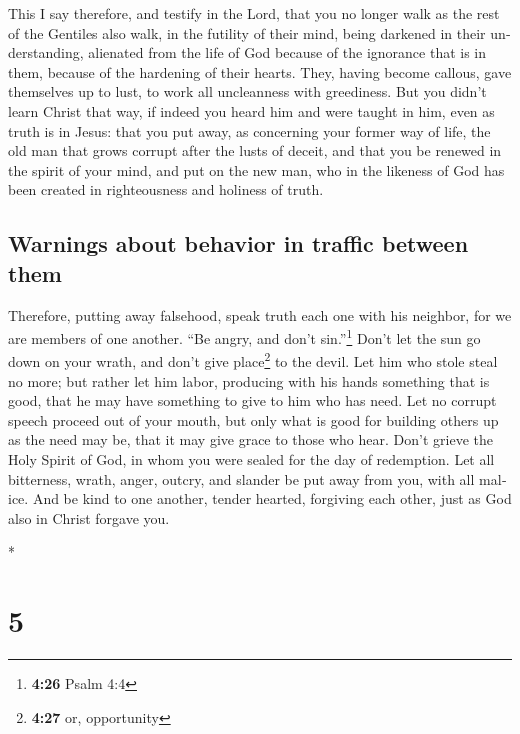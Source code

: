 \begin{paracol}{2}
\begin{otherlanguage}{english}
 This I say therefore, and testify in the Lord, that you
no longer walk as the rest of the Gentiles also walk, in the futility of
their mind,  being darkened in their understanding,
alienated from the life of God because of the ignorance that is in them,
because of the hardening of their hearts.  They, having
become callous, gave themselves up to lust, to work all uncleanness with
greediness.  But you didn't learn Christ that way,
 if indeed you heard him and were taught in him, even as
truth is in Jesus:  that you put away, as concerning your
former way of life, the old man that grows corrupt after the lusts of
deceit,  and that you be renewed in the spirit of your
mind,  and put on the new man, who in the likeness of God
has been created in righteousness and holiness of truth.

\hypertarget{warnings-about-behavior-in-traffic-between-them}{%
\subsection{Warnings about behavior in traffic between
them}\label{warnings-about-behavior-in-traffic-between-them}}

 Therefore, putting away falsehood, speak truth each one
with his neighbor, for we are members of one another. 
``Be angry, and don't sin.''\footnote{\textbf{4:26} Psalm 4:4} Don't let
the sun go down on your wrath,  and don't give
place\footnote{\textbf{4:27} or, opportunity} to the devil.
 Let him who stole steal no more; but rather let him
labor, producing with his hands something that is good, that he may have
something to give to him who has need.  Let no corrupt
speech proceed out of your mouth, but only what is good for building
others up as the need may be, that it may give grace to those who hear.
 Don't grieve the Holy Spirit of God, in whom you were
sealed for the day of redemption.  Let all bitterness,
wrath, anger, outcry, and slander be put away from you, with all malice.
 And be kind to one another, tender hearted, forgiving
each other, just as God also in Christ forgave you.

\end{otherlanguage}

\switchcolumn[0]*

\hypertarget{section-8}{%
\section{5}\label{section-8}}


\end{paracol}
